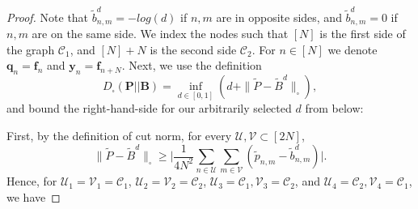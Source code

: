 \documentclass[letterpaper]{article} %
\begin{document}
\begin{proof}
    
Note that $\tilde{b}^d_{n,m}=-log(d)$ if $n,m$ are in opposite sides, and $\tilde{b}^d_{n,m}=0$ if $n,m$ are on the same side.
We index the nodes such that $[N]$ is the first side of the graph $\mathcal{C}_1$, and $[N]+N$ is the second side $\mathcal{C}_2$. For $n\in[N]$ we denote $\mathbf{q}_n=\mathbf{f}_n$ and  $\mathbf{y}_n=\mathbf{f}_{n+N}$.
Next, we use the definition 
\[D_{\square}(\mathbf{P} || \mathbf{B}) = \underset{d\in[0,1]}{\inf}(d + \| \tilde{P}-\tilde{B}^d\|_{\square }),\]
and bound the right-hand-side for our arbitrarily selected $d$ from below:

First, by the definition of cut norm, for every $\mathcal{U},\mathcal{V}\subset[2N]$,
\[\| \tilde{P}-\tilde{B}^d\|_{\square} \geq \Big|\frac{1}{4N^2}\sum_{n\in \mathcal{U}}\sum_{m\in \mathcal{V}} (\tilde{p}_{n,m} - \tilde{b}^d_{n,m})\Big|.\]
Hence, for $\mathcal{U}_1=\mathcal{V}_1=\mathcal{C}_1$, $\mathcal{U}_2=\mathcal{V}_2=\mathcal{C}_2$, $\mathcal{U}_3=\mathcal{C}_1,\mathcal{V}_3=\mathcal{C}_2$, and $\mathcal{U}_4=\mathcal{C}_2,\mathcal{V}_4=\mathcal{C}_1$, we have


\end{proof}
\end{document}
